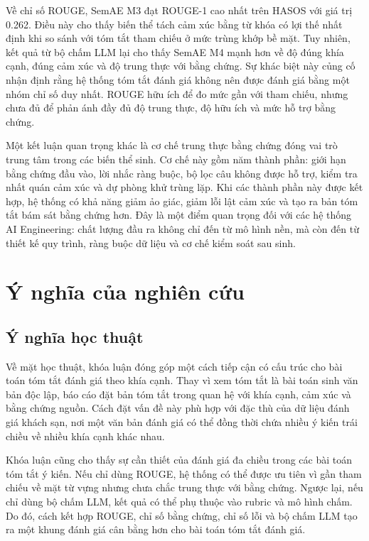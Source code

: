 Về chỉ số ROUGE, SemAE M3 đạt ROUGE-1 cao nhất trên HASOS với giá trị \num{0.262}. Điều này cho thấy biến thể tách cảm xúc bằng từ khóa có lợi thế nhất định khi so sánh với tóm tắt tham chiếu ở mức trùng khớp bề mặt. Tuy nhiên, kết quả từ bộ chấm LLM lại cho thấy SemAE M4 mạnh hơn về độ đúng khía cạnh, đúng cảm xúc và độ trung thực với bằng chứng. Sự khác biệt này củng cố nhận định rằng hệ thống tóm tắt đánh giá không nên được đánh giá bằng một nhóm chỉ số duy nhất. ROUGE hữu ích để đo mức gần với tham chiếu, nhưng chưa đủ để phản ánh đầy đủ độ trung thực, độ hữu ích và mức hỗ trợ bằng chứng.

Một kết luận quan trọng khác là cơ chế trung thực bằng chứng đóng vai trò trung tâm trong các biến thể sinh. Cơ chế này gồm năm thành phần: giới hạn bằng chứng đầu vào, lời nhắc ràng buộc, bộ lọc câu không được hỗ trợ, kiểm tra nhất quán cảm xúc và dự phòng khử trùng lặp. Khi các thành phần này được kết hợp, hệ thống có khả năng giảm ảo giác, giảm lỗi lật cảm xúc và tạo ra bản tóm tắt bám sát bằng chứng hơn. Đây là một điểm quan trọng đối với các hệ thống AI Engineering: chất lượng đầu ra không chỉ đến từ mô hình nền, mà còn đến từ thiết kế quy trình, ràng buộc dữ liệu và cơ chế kiểm soát sau sinh.

\section{Ý nghĩa của nghiên cứu}
\label{sec:chap5-y-nghia}

\subsection{Ý nghĩa học thuật}

Về mặt học thuật, khóa luận đóng góp một cách tiếp cận có cấu trúc cho bài toán tóm tắt đánh giá theo khía cạnh. Thay vì xem tóm tắt là bài toán sinh văn bản độc lập, báo cáo đặt bản tóm tắt trong quan hệ với khía cạnh, cảm xúc và bằng chứng nguồn. Cách đặt vấn đề này phù hợp với đặc thù của dữ liệu đánh giá khách sạn, nơi một văn bản đánh giá có thể đồng thời chứa nhiều ý kiến trái chiều về nhiều khía cạnh khác nhau.

Khóa luận cũng cho thấy sự cần thiết của đánh giá đa chiều trong các bài toán tóm tắt ý kiến. Nếu chỉ dùng ROUGE, hệ thống có thể được ưu tiên vì gần tham chiếu về mặt từ vựng nhưng chưa chắc trung thực với bằng chứng. Ngược lại, nếu chỉ dùng bộ chấm LLM, kết quả có thể phụ thuộc vào rubric và mô hình chấm. Do đó, cách kết hợp ROUGE, chỉ số bằng chứng, chỉ số lỗi và bộ chấm LLM tạo ra một khung đánh giá cân bằng hơn cho bài toán tóm tắt đánh giá.


